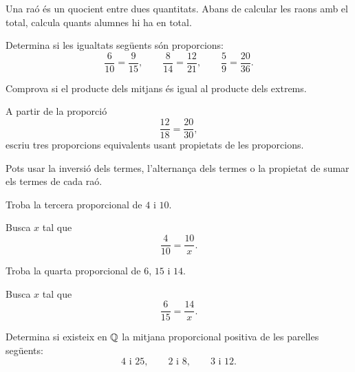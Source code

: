 \begin{indicacio}
	Una raó és un quocient entre dues quantitats. Abans de calcular les raons amb el total, calcula quants alumnes hi ha en total.
\end{indicacio}

\begin{exercici}[Proporcions]
	Determina si les igualtats següents són proporcions:
	\[
	\frac{6}{10}=\frac{9}{15},
	\qquad
	\frac{8}{14}=\frac{12}{21},
	\qquad
	\frac{5}{9}=\frac{20}{36}.
	\]
\end{exercici}

\begin{indicacio}
	Comprova si el producte dels mitjans és igual al producte dels extrems.
\end{indicacio}

\begin{exercici}
	A partir de la proporció
	\[
	\frac{12}{18}=\frac{20}{30},
	\]
	escriu tres proporcions equivalents usant propietats de les proporcions.
\end{exercici}

\begin{indicacio}
	Pots usar la inversió dels termes, l'alternança dels termes o la propietat de sumar els termes de cada raó.
\end{indicacio}

\begin{exercici}
	Troba la tercera proporcional de \(4\) i \(10\).
\end{exercici}

\begin{indicacio}
	Busca \(x\) tal que
	\[
	\frac{4}{10}=\frac{10}{x}.
	\]
\end{indicacio}

\begin{exercici}
	Troba la quarta proporcional de \(6\), \(15\) i \(14\).
\end{exercici}

\begin{indicacio}
	Busca \(x\) tal que
	\[
	\frac{6}{15}=\frac{14}{x}.
	\]
\end{indicacio}

\begin{exercici}
	Determina si existeix en \(\mathbb{Q}\) la mitjana proporcional positiva de les parelles següents:
	\[
	4\text{ i }25,
	\qquad
	2\text{ i }8,
	\qquad
	3\text{ i }12.
	\]
\end{exercici}

